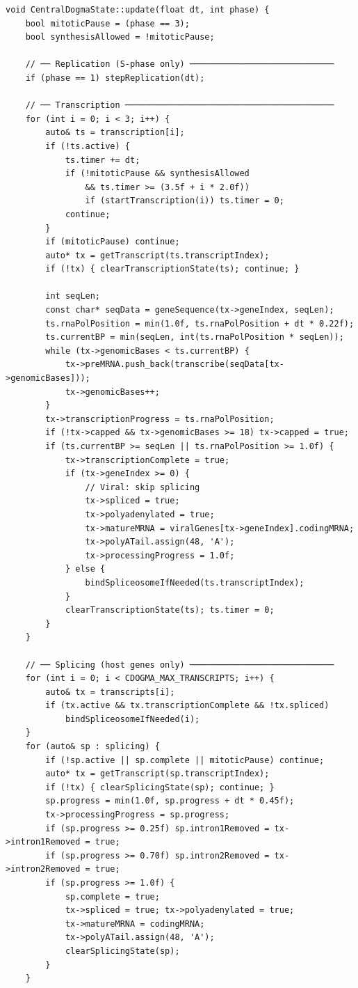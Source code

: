 \documentclass[11pt,letterpaper,twoside,openany]{book}
\begin{document}
\begin{lstlisting}[language={[ISO]C++}]
void CentralDogmaState::update(float dt, int phase) {
    bool mitoticPause = (phase == 3);
    bool synthesisAllowed = !mitoticPause;

    // ── Replication (S-phase only) ─────────────────────────────
    if (phase == 1) stepReplication(dt);

    // ── Transcription ──────────────────────────────────────────
    for (int i = 0; i < 3; i++) {
        auto& ts = transcription[i];
        if (!ts.active) {
            ts.timer += dt;
            if (!mitoticPause && synthesisAllowed
                && ts.timer >= (3.5f + i * 2.0f))
                if (startTranscription(i)) ts.timer = 0;
            continue;
        }
        if (mitoticPause) continue;
        auto* tx = getTranscript(ts.transcriptIndex);
        if (!tx) { clearTranscriptionState(ts); continue; }

        int seqLen;
        const char* seqData = geneSequence(tx->geneIndex, seqLen);
        ts.rnaPolPosition = min(1.0f, ts.rnaPolPosition + dt * 0.22f);
        ts.currentBP = min(seqLen, int(ts.rnaPolPosition * seqLen));
        while (tx->genomicBases < ts.currentBP) {
            tx->preMRNA.push_back(transcribe(seqData[tx->genomicBases]));
            tx->genomicBases++;
        }
        tx->transcriptionProgress = ts.rnaPolPosition;
        if (!tx->capped && tx->genomicBases >= 18) tx->capped = true;
        if (ts.currentBP >= seqLen || ts.rnaPolPosition >= 1.0f) {
            tx->transcriptionComplete = true;
            if (tx->geneIndex >= 0) {
                // Viral: skip splicing
                tx->spliced = true;
                tx->polyadenylated = true;
                tx->matureMRNA = viralGenes[tx->geneIndex].codingMRNA;
                tx->polyATail.assign(48, 'A');
                tx->processingProgress = 1.0f;
            } else {
                bindSpliceosomeIfNeeded(ts.transcriptIndex);
            }
            clearTranscriptionState(ts); ts.timer = 0;
        }
    }

    // ── Splicing (host genes only) ─────────────────────────────
    for (int i = 0; i < CDOGMA_MAX_TRANSCRIPTS; i++) {
        auto& tx = transcripts[i];
        if (tx.active && tx.transcriptionComplete && !tx.spliced)
            bindSpliceosomeIfNeeded(i);
    }
    for (auto& sp : splicing) {
        if (!sp.active || sp.complete || mitoticPause) continue;
        auto* tx = getTranscript(sp.transcriptIndex);
        if (!tx) { clearSplicingState(sp); continue; }
        sp.progress = min(1.0f, sp.progress + dt * 0.45f);
        tx->processingProgress = sp.progress;
        if (sp.progress >= 0.25f) sp.intron1Removed = tx->intron1Removed = true;
        if (sp.progress >= 0.70f) sp.intron2Removed = tx->intron2Removed = true;
        if (sp.progress >= 1.0f) {
            sp.complete = true;
            tx->spliced = true; tx->polyadenylated = true;
            tx->matureMRNA = codingMRNA;
            tx->polyATail.assign(48, 'A');
            clearSplicingState(sp);
        }
    }


\end{lstlisting}
\end{document}
